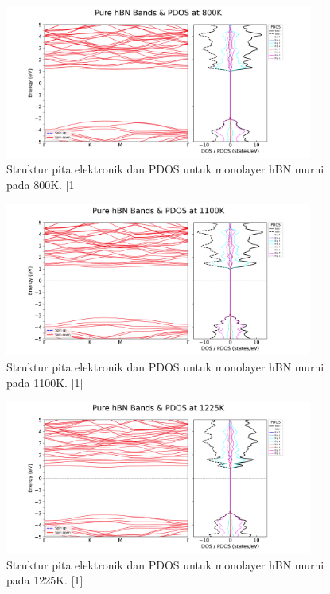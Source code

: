 \begin{figure}[h!]
    \centering
    \includegraphics[width=0.9\textwidth]{gambar_hasil/simple_bands_pdos_pure_800K.png}
    \caption{Struktur pita elektronik dan PDOS untuk monolayer hBN murni pada 800K. [1]}
    \label{fig:hbn_pure_800K}
\end{figure}

\begin{figure}[h!]
    \centering
    \includegraphics[width=0.9\textwidth]{gambar_hasil/simple_bands_pdos_pure_1100K.png}
    \caption{Struktur pita elektronik dan PDOS untuk monolayer hBN murni pada 1100K. [1]}
    \label{fig:hbn_pure_1100K}
\end{figure}

\begin{figure}[h!]
    \centering
    \includegraphics[width=0.9\textwidth]{gambar_hasil/simple_bands_pdos_pure_1225K.png}
    \caption{Struktur pita elektronik dan PDOS untuk monolayer hBN murni pada 1225K. [1]}
    \label{fig:hbn_pure_1225K}
\end{figure}


